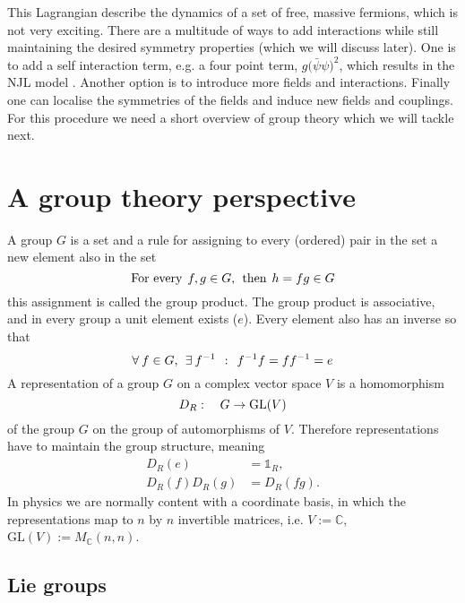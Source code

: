 This Lagrangian describe the dynamics of a set of free, massive fermions, which
is not very exciting. There are a multitude of ways to add interactions while
still maintaining the desired symmetry properties (which we will discuss later).
One is to add a self interaction term, e.g. a four point term, $g
\big(\bar{\psi}\psi\big)^2$, which results in the NJL model
\citep{Nambu:1961tp}. Another option is to introduce more fields and
interactions. Finally one can localise the symmetries of the fields and induce
new fields and couplings. For this procedure we need a short overview of group
theory which we will tackle next.

\section{A group theory perspective} \label{sec-group_intro}

A group $G$ is a set and a rule for assigning to every (ordered) pair in the set
a new element also in the set
%
\begin{equation}
  \text{For every} \hskip1ex f, g \in G, \hskip1ex\text{then}\hskip1ex
    h = fg \in G
\end{equation}
%
this assignment is called the group product. The group product is associative,
and in every group a unit element exists ($e$). Every element also has an inverse so
that
%
\begin{equation}
  \forall\hskip.5ex f \in G, \hskip1ex\exists\hskip.5ex f^{-1}
    \hskip1ex:\hskip1ex f^{-1} f = f f^{-1} = e
\end{equation}
%
A representation of a group $G$ on a complex vector space $V$ is a homomorphism
%
\begin{equation}
  D_{R}:\hskip1em G \to \text{GL}(V)
\end{equation}
%
of the group $G$ on the group of automorphisms of $V$. Therefore representations
have to maintain the group structure, meaning
%
\begin{align}
  D_R(e) &= \mathbb{1}_R,\\
  D_R(f) D_R(g) &= D_R(fg). \label{eq-group_prod}
\end{align}
%
In physics we are normally content with a coordinate basis, in which the
representations map to $n$ by $n$ invertible matrices, i.e. $V := \mathbb{C}$,
$\text{GL}(V) := M_{\mathbb{C}}(n,n)$.

\subsection{Lie groups}


